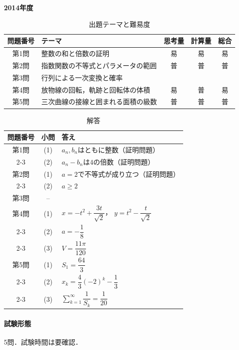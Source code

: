 \documentclass[../../main.tex]{subfiles}
\begin{document}
\begin{center}
  {\fontsize{48pt}{58pt}\selectfont \textbf{2014}\normalsize\textbf{年度}}
\end{center}

\begin{table}[htb]
  \centering
  \caption{出題テーマと難易度}
  \begin{tabular}{|c|p{6.2cm}|c|c|c|}
    \hline
    \textbf{問題番号} & \textbf{テーマ} & \textbf{思考量} & \textbf{計算量} & \textbf{総合} \\
    \hline
    第1問 & 整数の和と倍数の証明 & 易 & 易 & 易 \\
    \hline
    第2問 & 指数関数の不等式とパラメータの範囲 & 普 & 普 & 普 \\
    \hline
    第3問 & 行列による一次変換と確率 &  &  &  \\
    \hline
    第4問 & 放物線の回転，軌跡と回転体の体積 & 易 & 普 & 易 \\
    \hline
    第5問 & 三次曲線の接線と囲まれる面積の級数 & 普 & 普 & 普 \\
    \hline
  \end{tabular}
\end{table}

\begin{table}[htb]
  \centering
  \caption{解答}
  \renewcommand{\arraystretch}{1.4}
  \begin{tabular}{|c|c|p{9cm}|}
    \hline
    \textbf{問題番号} & \textbf{小問} & \textbf{答え} \\
    \hline
    第1問 & (1) & $a_n,b_n$はともに整数（証明問題） \\
    \cline{2-3}
    & (2) & $a_n-b_n$は$4$の倍数（証明問題） \\
    \hline
    第2問 & (1) & $a=2$で不等式が成り立つ（証明問題） \\
    \cline{2-3}
    & (2) & $a\ge2$ \\
    \hline
    第3問 & -- & \\
    \hline
    第4問 & (1) & $x=-t^2+\dfrac{3t}{\sqrt{2}}$，
    $y=t^2-\dfrac{t}{\sqrt{2}}$ \\
    \cline{2-3}
    & (2) & $a=-\dfrac{1}{8}$ \\
    \cline{2-3}
    & (3) & $V=\dfrac{11\pi}{120}$ \\
    \hline
    第5問 & (1) & $S_1=\dfrac{64}{3}$ \\
    \cline{2-3}
    & (2) & $x_k=\dfrac{4}{3}(-2)^k-\dfrac{1}{3}$ \\
    \cline{2-3}
    & (3) & $\displaystyle\sum_{k=1}^{\infty}\dfrac{1}{S_k}=\dfrac{1}{20}$ \\
    \hline
  \end{tabular}
\end{table}

\paragraph{試験形態}
5問．試験時間は要確認．
\end{document}
